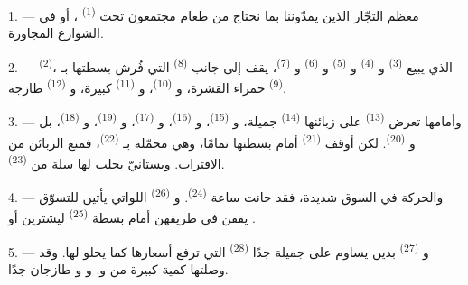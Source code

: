 
\VUsaut{4.0mm}
\VUsaut{3.0mm}

\VUsaut{3.0mm}

1. --- معظم التجّار الذين يمدّوننا بما نحتاج من طعام مجتمعون تحت
 \textsuperscript{(1)} ، أو في الشوارع
المجاورة.

2. ---  \textsuperscript{(2)}، الذي يبيع  \textsuperscript{(3)} و \textsuperscript{(4)}
و \textsuperscript{(5)} و \textsuperscript{(6)}
و \textsuperscript{(7)}، يقف إلى جانب 
\textsuperscript{(8)} التي فُرش بسطتها بـ \textsuperscript{(9)}
حمراء القشرة، و \textsuperscript{(10)}، و
\textsuperscript{(11)} كبيرة، و \textsuperscript{(12)} طازجة.

3. --- وأمامها تعرض  \textsuperscript{(13)} على زبائنها
 \textsuperscript{(14)} جميلة، و \textsuperscript{(15)}،
و \textsuperscript{(16)}، و \textsuperscript{(17)}،
و \textsuperscript{(19)}، و \textsuperscript{(18)}، بل
و \textsuperscript{(20)}. لكن  أوقف
 \textsuperscript{(21)} أمام بسطتها تمامًا، وهي محمّلة
بـ \textsuperscript{(22)}، فمنع الزبائن من الاقتراب.
وبستانيّ يجلب لها سلة من  \textsuperscript{(23)}.

\VUsaut{4.0mm}
\VUsaut{3.0mm}

4. --- والحركة في السوق شديدة، فقد حانت ساعة  \textsuperscript{(24)}.
و \textsuperscript{(26)} اللواتي يأتين للتسوّق يقفن في
طريقهن أمام بسطة  \textsuperscript{(25)} ليشترين
 أو .

5. --- و \textsuperscript{(27)} بدين يساوم على  جميلة
جدًا  \textsuperscript{(28)} التي ترفع أسعارها كما يحلو
لها. وقد وصلتها كمية كبيرة من 
و. و و طازجان جدًا.

